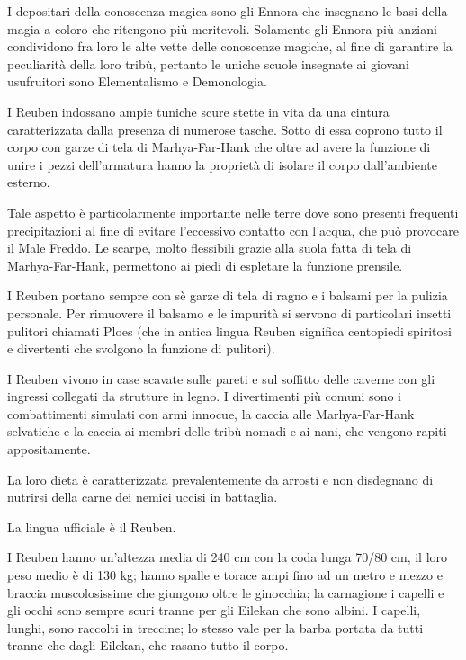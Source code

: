 I depositari della conoscenza magica sono gli Ennora che insegnano le
basi della magia a coloro che ritengono pi\`u meritevoli. Solamente
gli Ennora pi\`u anziani condividono fra loro le alte vette delle
conoscenze magiche, al fine di garantire la peculiarit\`a della loro
trib\`u, pertanto le uniche scuole insegnate ai giovani usufruitori
sono Elementalismo e Demonologia.

\Moda I Reuben
indossano ampie tuniche scure stette in vita da una cintura
caratterizzata dalla presenza di numerose tasche. Sotto di essa
coprono tutto il corpo con garze di tela di Marhya-Far-Hank che oltre
ad avere la funzione di unire i pezzi dell'armatura hanno la
propriet\`a di isolare il corpo dall'ambiente esterno. 

Tale aspetto
\`e particolarmente importante nelle terre dove sono presenti
frequenti precipitazioni al fine di evitare l'eccessivo contatto con
l'acqua, che pu\`o provocare il Male Freddo. Le scarpe, molto
flessibili grazie alla suola fatta di tela di Marhya-Far-Hank, permettono
ai piedi di espletare la funzione prensile.  

I Reuben portano sempre con s\`e
garze di tela di ragno e i balsami per la pulizia personale. Per
rimuovere il balsamo e le impurit\`a si servono di particolari
insetti pulitori chiamati Ploes (che in antica lingua Reuben significa
centopiedi spiritosi e divertenti che svolgono la funzione di
pulitori). 

I Reuben vivono in case scavate sulle pareti e sul soffitto
delle caverne con gli ingressi collegati da strutture in legno. I
divertimenti pi\`u comuni sono i combattimenti simulati con armi
innocue, la caccia alle Marhya-Far-Hank selvatiche e la caccia ai
membri delle trib\`u nomadi e ai nani, che vengono rapiti
appositamente. 

La loro dieta \`e caratterizzata prevalentemente da
arrosti e non disdegnano di nutrirsi della carne dei nemici uccisi in
battaglia. 

La lingua ufficiale \`e il Reuben.

\Fisico I Reuben hanno un'altezza media di 240 cm con la coda lunga 70/80
cm, il loro peso medio \`e di 130 kg; hanno spalle e torace ampi fino ad
un metro e mezzo e braccia muscolosissime che giungono oltre le
ginocchia; la carnagione i capelli e gli occhi sono sempre scuri
tranne per gli Eilekan che sono albini. I capelli, lunghi, sono
raccolti in treccine; lo stesso vale per la barba portata da tutti
tranne che dagli Eilekan, che rasano tutto il corpo. 

